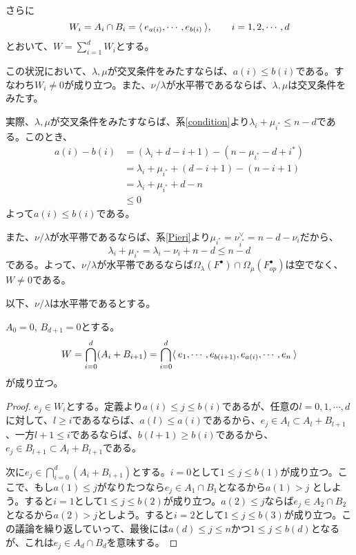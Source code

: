 \documentclass{ltjsreport}
\begin{document}
さらに
\[
W_i=A_i\cap B_i=\langle\:e_{a(i)},\cdots,e_{b(i)}\:\rangle,  \qquad i=1,2,\cdots,d
\]
とおいて、$W=\sum_{i=1}^dW_i$とする。

この状況において、$\lambda,\mu$が交叉条件をみたすならば、$a(i)\leq b(i)$である。すなわち$W_i\neq 0$が成り立つ。また、$\nu/\lambda$が水平帯であるならば、$\lambda,\mu$は交叉条件をみたす。

実際、$\lambda,\mu$が交叉条件をみたすならば、系\ref{condition}より$\lambda_i+\mu_{i^*}\leq n-d$である。このとき、
  \begin{align*}
    a(i)-b(i)
    &=(\lambda_i+d-i+1)-(n-\mu_{i^*}-d+i^*)\\
    &=\lambda_i+\mu_{i^*}+(d-i+1)-(n-i+1)\\
    &=\lambda_i+\mu_{i^*}+d-n\\
    &\leq 0
  \end{align*}
よって$a(i)\leq b(i)$である。

また、$\nu/\lambda$が水平帯であるならば、系\ref{Pieri}より$\mu_{i^*}=\nu^\vee_{i^*}=n-d-\nu_{i}$だから、
\[
\lambda_i+\mu_{i^*}=\lambda_i-\nu_i+n-d \leq n-d 
\]
である。よって、$\nu/\lambda$が水平帯であるならば$\Omega_{\lambda}(F^\bullet)\cap\Omega_{\mu}(F^\bullet_{op})$は空でなく、$W\neq 0$である。

以下、$\nu/\lambda$は水平帯であるとする。

\begin{lemm}\label{W_form}
  $A_0=0$, $B_{d+1}=0$とする。
  \[
  W=\bigcap_{i=0}^d (A_i+B_{i+1})=\bigcap_{i=0}^d \langle\:e_1,\cdots,e_{b(i+1)},e_{a(i)},\cdots,e_n\:\rangle
  \]
  が成り立つ。
\end{lemm}

\begin{proof}
  $e_j\in W_i$とする。定義より$a(i)\leq j\leq b(i)$であるが、任意の$l=0,1,\cdots,d$に対して、$l\geq i$であるならば、$a(l)\leq a(i)$であるから、$e_j\in A_{l}\subset A_{l}+B_{l+1}$、一方$l+1\leq i$であるならば、$b(l+1)\geq b(i)$であるから、$e_j\in B_{l+1}\subset A_l+B_{l+1}$である。

  次に$e_j\in \bigcap_{i=0}^d (A_i+B_{i+1})$とする。$i=0$として$1\leq j \leq b(1)$が成り立つ。ここで、もし$a(1)\leq j$がなりたつなら$e_j\in A_1\cap B_1$となるから$a(1) > j$ としよう。すると$i=1$として$1\leq j\leq b(2)$が成り立つ。$a(2)\leq j$ならば$e_j\in A_2\cap B_2$となるから$a(2)>j$としよう。すると$i=2$として$1\leq j\leq b(3)$が成り立つ。この議論を繰り返していって、最後には$a(d)\leq j\leq n$かつ$1\leq j\leq b(d)$となるが、これは$e_j\in A_d\cap B_d$を意味する。
\end{proof}
\end{document}
